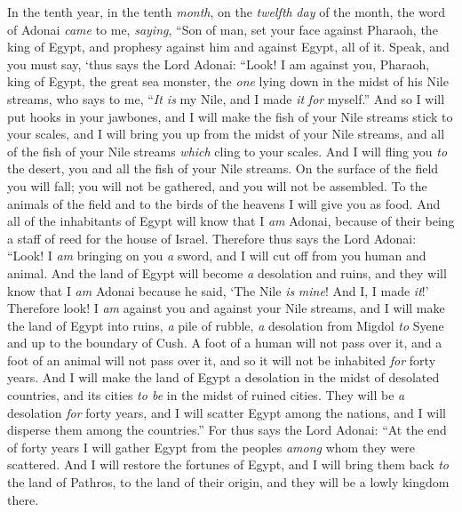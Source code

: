\begin{biblechapter} %
 In the tenth year, in the tenth \textit{month}, on the \textit{twelfth} \textit{day} of the month, the word of Adonai \textit{came} to me, \textit{saying},
\verse “Son of man, set your face against Pharaoh, the king of Egypt, and prophesy against him and against Egypt, all of it.
\verse Speak, and you must say, ‘thus says the Lord Adonai:
\verse “Look! I am against you, 
Pharaoh, king of Egypt, 
the great sea monster, 
the \textit{one} lying down 
in the midst of his Nile streams, 
who says to me, “\textit{It is} my Nile, and I made \textit{it} \textit{for} myself.”
\verse And so I will put hooks in your jawbones, 
and I will make the fish of your Nile streams stick to your scales, 
and I will bring you up from the midst of your Nile streams, 
and all of the fish of your Nile streams \textit{which} cling to your scales.
\verse And I will fling you \textit{to} the desert, 
you and all the fish of your Nile streams. 
On the surface of the field you will fall; 
you will not be gathered, 
and you will not be assembled. 
To the animals of the field 
and to the birds of the heavens 
I will give you as food.
\verse And all of the inhabitants of Egypt will know that I \textit{am} Adonai, 
because of their being a staff of reed for the house of Israel.
\verse Therefore thus says the Lord Adonai: “Look! I \textit{am} bringing on you \textit{a} sword, and I will cut off from you human and animal.
\verse And the land of Egypt will become \textit{a} desolation and ruins, and they will know that I \textit{am} Adonai because he said, ‘The Nile \textit{is} \textit{mine}! And I, I made \textit{it}!’
\verse Therefore look! I \textit{am} against you and against your Nile streams, and I will make the land of Egypt into ruins, \textit{a} pile of rubble, \textit{a} desolation from Migdol \textit{to} Syene and up to the boundary of Cush.
\verse A foot of a human will not pass over it, and a foot of an animal will not pass over it, and so it will not be inhabited \textit{for} forty years.
\verse And I will make the land of Egypt a desolation in the midst of desolated countries, and its cities \textit{to be} in the midst of ruined cities. They will be \textit{a} desolation \textit{for} forty years, and I will scatter Egypt among the nations, and I will disperse them among the countries.”
\verse For thus says the Lord Adonai: “At the end of forty years I will gather Egypt from the peoples \textit{among} whom they were scattered.
\verse And I will restore the fortunes of Egypt, and I will bring them back \textit{to} the land of Pathros, to the land of their origin, and they will be a lowly kingdom there.

\end{biblechapter}
